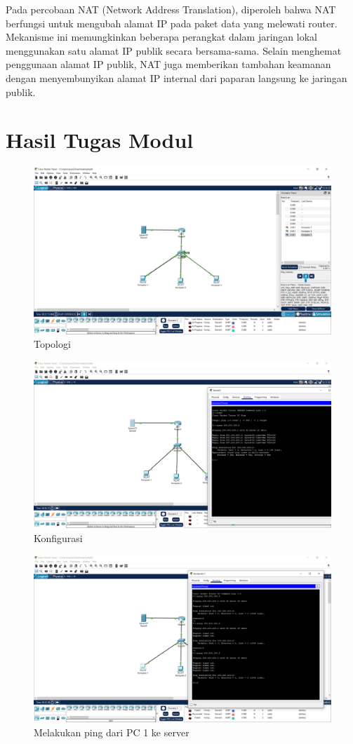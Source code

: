 Pada percobaan NAT (Network Address Translation), diperoleh bahwa NAT berfungsi untuk mengubah alamat IP pada paket data yang melewati router. Mekanisme ini memungkinkan beberapa perangkat dalam jaringan lokal menggunakan satu alamat IP publik secara bersama-sama. Selain menghemat penggunaan alamat IP publik, NAT juga memberikan tambahan keamanan dengan menyembunyikan alamat IP internal dari paparan langsung ke jaringan publik.

\section{Hasil Tugas Modul}
    \begin{figure}[H]
        \centering
        \includegraphics[width=0.5\linewidth]{P1/img/topologi.png}
        \caption{Topologi}
        \label{fig:gambar}
    \end{figure}

    \begin{figure}[H]
        \centering
        \includegraphics[width=0.5\linewidth]{P1/img/konfig.png}
        \caption{Konfigurasi}
        \label{fig:gambar}
    \end{figure}

    \begin{figure}[H]
        \centering
        \includegraphics[width=0.5\linewidth]{P1/img/pingpc1.png}
        \caption{Melakukan ping dari PC 1 ke server}
        \label{fig:gambar}
    \end{figure}

